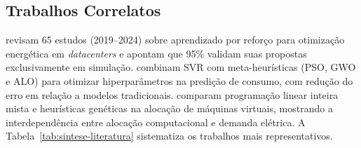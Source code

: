 \documentclass[a4paper,12pt]{article}
\begin{document}
\subsection{Trabalhos Correlatos}
\label{sec:trabalhos-correlatos}

 revisam 65 estudos (2019--2024) sobre aprendizado por reforço para otimização energética em \textit{datacenters} e apontam que 95\% validam suas propostas exclusivamente em simulação.  combinam SVR com meta-heurísticas (PSO, GWO e ALO) para otimizar hiperparâmetros na predição de consumo, com redução do erro em relação a modelos tradicionais.  comparam programação linear inteira mista e heurísticas genéticas na alocação de máquinas virtuais, mostrando a interdependência entre alocação computacional e demanda elétrica. A Tabela~\ref{tab:sintese-literatura} sistematiza os trabalhos mais representativos.
\end{document}
